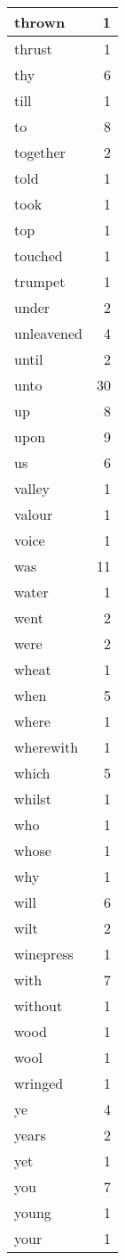 \begin{center}
\begin{longtable}{l|r}
thrown & 1\\ \hline 
thrust & 1\\ \hline 
thy & 6\\ \hline 
till & 1\\ \hline 
to & 8\\ \hline 
together & 2\\ \hline 
told & 1\\ \hline 
took & 1\\ \hline 
top & 1\\ \hline 
touched & 1\\ \hline 
trumpet & 1\\ \hline 
under & 2\\ \hline 
unleavened & 4\\ \hline 
until & 2\\ \hline 
unto & 30\\ \hline 
up & 8\\ \hline 
upon & 9\\ \hline 
us & 6\\ \hline 
valley & 1\\ \hline 
valour & 1\\ \hline 
voice & 1\\ \hline 
was & 11\\ \hline 
water & 1\\ \hline 
went & 2\\ \hline 
were & 2\\ \hline 
wheat & 1\\ \hline 
when & 5\\ \hline 
where & 1\\ \hline 
wherewith & 1\\ \hline 
which & 5\\ \hline 
whilst & 1\\ \hline 
who & 1\\ \hline 
whose & 1\\ \hline 
why & 1\\ \hline 
will & 6\\ \hline 
wilt & 2\\ \hline 
winepress & 1\\ \hline 
with & 7\\ \hline 
without & 1\\ \hline 
wood & 1\\ \hline 
wool & 1\\ \hline 
wringed & 1\\ \hline 
ye & 4\\ \hline 
years & 2\\ \hline 
yet & 1\\ \hline 
you & 7\\ \hline 
young & 1\\ \hline 
your & 1\\ \hline 
\end{longtable}
\end{center}



